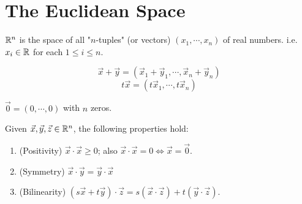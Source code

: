 \documentclass[11pt]{article}
\newcommand{\x}{\vec{x}}
\newcommand{\y}{\vec{y}}
\newcommand{\z}{\vec{z}}
\begin{document}
\ahead


\section{The Euclidean Space}

\vspace{2mm}

\begin{definition}
    $\mathbb{R}^n$ is the space of all "$n$-tuples" (or vectors) $(x_1, \cdots, x_n)$ of real numbers. i.e. $x_i \in \mathbb{R}$ for each $1 \leq i \leq n$. 
\end{definition}

\begin{definition}
    \[\x + \y = (\x_1 + \y_1, \cdots, \x_n + \y_n)\]
    \[t\x = (t\x_1, \cdots, t\x_n)\]
\end{definition}

\begin{example}
    $\vec{0} = (0, \cdots, 0)$ with $n$ zeros. 
\end{example}

\begin{theorem}
    Given $\x, \y, \z \in \R^n$, the following properties hold: 
    \begin{enumerate}[label = (\roman*)]
        \item (Positivity) $\x \cdot \x \geq 0$; also $\x \cdot \x = 0 \iff \x = \vec{0}$. 
        \item (Symmetry) $\x \cdot \y = \y \cdot \x$
        \item (Bilinearity) $(s\x + t\y)\cdot \z = s(\x\cdot\z) + t(\y\cdot\z)$. 
    \end{enumerate}
\end{theorem}
\end{document}
